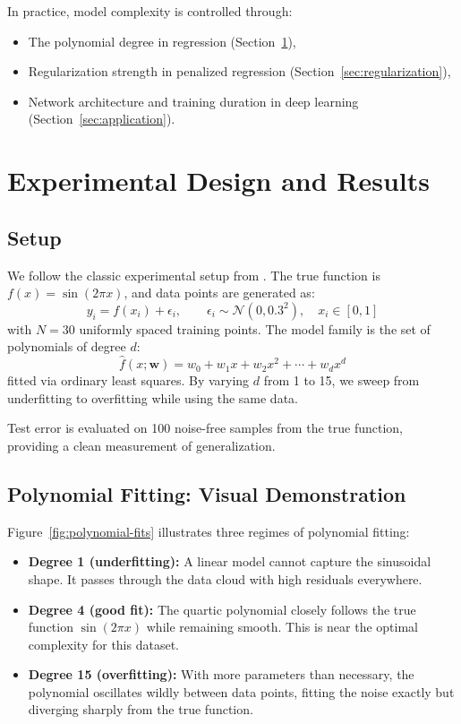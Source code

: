 \documentclass[12pt, a4paper]{article}
\begin{document}
In practice, model complexity is controlled through:
\begin{itemize}
    \item The polynomial degree in regression (Section~\ref{sec:experiments}),
    \item Regularization strength in penalized regression (Section~\ref{sec:regularization}),
    \item Network architecture and training duration in deep learning (Section~\ref{sec:application}).
\end{itemize}

\section{Experimental Design and Results}
\label{sec:experiments}

\subsection{Setup}

We follow the classic experimental setup from \citet{bishop2006pattern}. The true
function is $f(x) = \sin(2\pi x)$, and data points are generated as:
\[
y_i = f(x_i) + \epsilon_i, \qquad \epsilon_i \sim \mathcal{N}(0, 0.3^2),
\quad x_i \in [0, 1]
\]
with $N = 30$ uniformly spaced training points. The model family is the set of
polynomials of degree $d$:
\[
\hat{f}(x; \mathbf{w}) = w_0 + w_1 x + w_2 x^2 + \cdots + w_d x^d
\]
fitted via ordinary least squares. By varying $d$ from 1 to 15, we sweep from
underfitting to overfitting while using the same data.

Test error is evaluated on 100 noise-free samples from the true function, providing
a clean measurement of generalization.

\subsection{Polynomial Fitting: Visual Demonstration}

Figure~\ref{fig:polynomial-fits} illustrates three regimes of polynomial fitting:
\begin{itemize}
    \item \textbf{Degree 1 (underfitting):} A linear model cannot capture the sinusoidal
          shape. It passes through the data cloud with high residuals everywhere.
    \item \textbf{Degree 4 (good fit):} The quartic polynomial closely follows the true
          function $\sin(2\pi x)$ while remaining smooth. This is near the optimal
          complexity for this dataset.
    \item \textbf{Degree 15 (overfitting):} With more parameters than necessary, the
          polynomial oscillates wildly between data points, fitting the noise exactly
          but diverging sharply from the true function.
\end{itemize}
\end{document}
